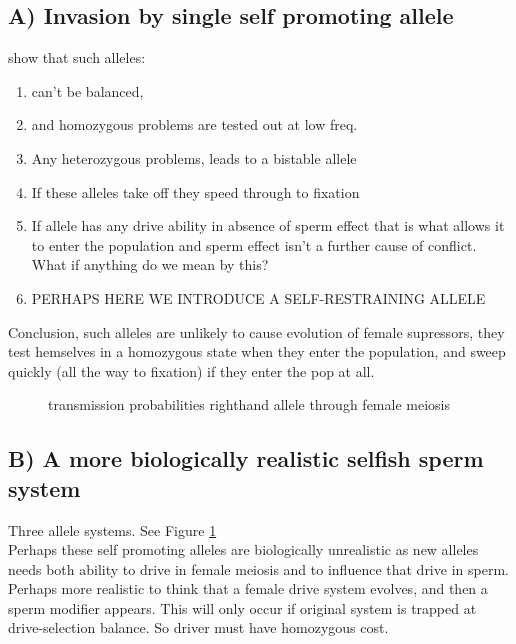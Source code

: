 \documentclass[12pt,letterpaper]{article}
\begin{document}
\subsection*{ A) Invasion by single self promoting allele}




show that such alleles:
\begin{enumerate}
\item can't be balanced, \\
\item and homozygous problems are tested out at low freq.  \\
\item Any heterozygous problems, leads to a bistable allele\\
\item If these alleles take off they speed through to fixation\\
\item If allele has any drive ability in absence of sperm effect that is what allows it to enter the population
and sperm effect isn't a further cause of conflict. What if anything do we mean by this?\\
\item PERHAPS HERE WE INTRODUCE A SELF-RESTRAINING ALLELE
\end{enumerate}

Conclusion, such alleles are unlikely to cause evolution of female supressors, they test hemselves in a homozygous
state when they enter the population, and sweep quickly (all the way to fixation) if they enter the pop at all.\\

\begin{figure}
\caption{transmission probabilities righthand allele through female
  meiosis}  \label{Eggsperm_3_allele_cartoon}
\end{figure}


\subsection*{B) A more biologically realistic selfish sperm system}
Three allele systems. See Figure \ref{Eggsperm_3_allele_cartoon} \\ 
Perhaps these self promoting alleles are biologically unrealistic as new alleles needs 
both ability to drive in female meiosis and to influence that drive in sperm.
Perhaps more realistic to think that a female drive system evolves, 
and then a sperm modifier appears. This will only occur if original system is trapped 
at drive-selection balance. So driver must have homozygous cost.
\end{document}
